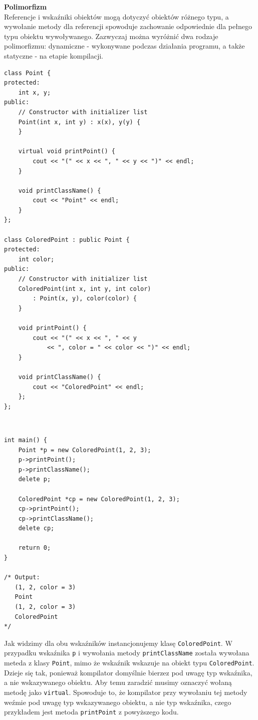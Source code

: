 \documentclass[12pt]{article}
\begin{document}
    \begin{definition}
    \textbf{Polimorfizm} \\
    Referencje i wskaźniki obiektów mogą dotyczyć obiektów różnego typu, a wywołanie metody dla referencji spowoduje zachowanie
    odpowiednie dla pełnego typu obiektu wywoływanego. Zazwyczaj można wyróżnić dwa rodzaje polimorfizmu: dynamiczne - wykonywane podczas działania programu,
    a także statyczne - na etapie kompilacji.
    \begin{verbatim}
class Point {
protected:
    int x, y;
public:
    // Constructor with initializer list
    Point(int x, int y) : x(x), y(y) {
    }

    virtual void printPoint() {
        cout << "(" << x << ", " << y << ")" << endl;
    }

    void printClassName() {
        cout << "Point" << endl;
    }
};

class ColoredPoint : public Point {
protected:
    int color;
public:
    // Constructor with initializer list
    ColoredPoint(int x, int y, int color)
        : Point(x, y), color(color) {
    }

    void printPoint() {
        cout << "(" << x << ", " << y
            << ", color = " << color << ")" << endl;
    }

    void printClassName() {
        cout << "ColoredPoint" << endl;
    };
};
	\end{verbatim}
	\end{definition}
	\begin{definition} \textbf{} \\
	\begin{verbatim}
int main() {
    Point *p = new ColoredPoint(1, 2, 3);
    p->printPoint();
    p->printClassName();
    delete p;

    ColoredPoint *cp = new ColoredPoint(1, 2, 3);
    cp->printPoint();
    cp->printClassName();
    delete cp;

    return 0;
}

/* Output:
   (1, 2, color = 3)
   Point
   (1, 2, color = 3)
   ColoredPoint
*/
    \end{verbatim}
    
    Jak widzimy dla obu wskaźników instancjonujemy klasę \texttt{ColoredPoint}. W przypadku wskaźnika \texttt{p} i wywołania metody \texttt{printClassName}
    została wywołana meteda z klasy \texttt{Point}, mimo że wskaźnik wskazuje na obiekt typu \texttt{ColoredPoint}. Dzieje się tak, ponieważ kompilator domyślnie
    bierzez pod uwagę typ wskaźnika, a nie wskazywanego obiektu. Aby temu zaradzić musimy oznaczyć wołaną metodę jako \texttt{virtual}. Spowoduje to, że
    kompilator przy wywołaniu tej metody weźmie pod uwagę typ wskazywanego obiektu, a nie typ wskaźnika, czego przykładem jest metoda \texttt{printPoint}
    z powyższego kodu.
    \end{definition}
    
\end{document}
